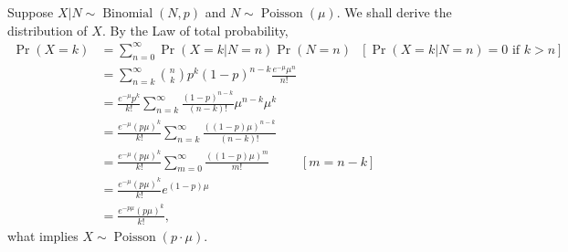 \documentclass[a4paper,10pt, notitlepage]{report}
\newcommand{\pr}{\operatorname{Pr}} %
\newcommand{\Bin}{\operatorname{Binomial}}
\newcommand{\Poi}{\operatorname{Poisson}}
\begin{document}
Suppose $X|N \sim \Bin(N, p)$ and $N \sim \Poi(\mu)$. We shall derive the
distribution of $X$. By the Law of total probability, 
\begin{equation}
    \begin{split}
        \pr(X = k) &= \sum_{n=0}^{\infty} \pr(X = k|N = n)\pr(N = n) ~~~ [\pr(X = k| N = n) = 0 \text{ if } k > n] \\  
        &= \sum_{n=k}^{\infty} \binom{n}{k}p^k(1-p)^{n-k}\frac{e^{-\mu}\mu^n}{n!} \\
        &= \frac{e^{-\mu}p^k}{k!}\sum_{n=k}^{\infty} \frac{(1-p)^{n-k}}{(n-k)!}\mu^{n-k}\mu^k \\
        &= \frac{e^{-\mu}(p\mu)^k}{k!}\sum_{n=k}^{\infty} \frac{((1-p)\mu)^{n-k}}{(n-k)!} \\
        &= \frac{e^{-\mu}(p\mu)^k}{k!}\sum_{m=0}^{\infty} \frac{((1-p)\mu)^{m}}{m!} ~~~~~~~~~~~ [m = n-k] \\
        &= \frac{e^{-\mu}(p\mu)^k}{k!}e^{(1-p)\mu} \\
        &= \frac{e^{-p\mu}(p\mu)^k}{k!}, 
    \end{split}
\end{equation}
what implies $X \sim \Poi(p\cdot\mu)$.






\end{document}

